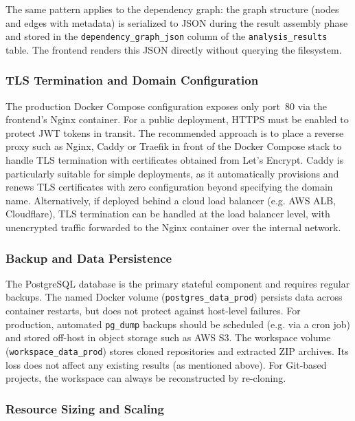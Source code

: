 The same pattern applies to the dependency graph: the graph structure (nodes and edges with metadata) is serialized to JSON during the result assembly phase and stored in the \texttt{dependency\_graph\_json} column of the \texttt{analysis\_results} table. The frontend renders this JSON directly without querying the filesystem.

\subsubsection{TLS Termination and Domain Configuration}
\label{subsubsec:tls}

\par The production Docker Compose configuration exposes only port~80 via the frontend's Nginx container. For a public deployment, HTTPS must be enabled to protect JWT tokens in transit. The recommended approach is to place a reverse proxy such as Nginx, Caddy or Traefik in front of the Docker Compose stack to handle TLS termination with certificates obtained from Let's Encrypt. Caddy is particularly suitable for simple deployments, as it automatically provisions and renews TLS certificates with zero configuration beyond specifying the domain name. Alternatively, if deployed behind a cloud load balancer (e.g. AWS ALB, Cloudflare), TLS termination can be handled at the load balancer level, with unencrypted traffic forwarded to the Nginx container over the internal network.

\subsubsection{Backup and Data Persistence}
\label{subsubsec:backup}

\par The PostgreSQL database is the primary stateful component and requires regular backups. The named Docker volume (\texttt{postgres\_data\_prod}) persists data across container restarts, but does not protect against host-level failures. For production, automated \texttt{pg\_dump} backups should be scheduled (e.g. via a cron job) and stored off-host in object storage such as AWS S3. The workspace volume (\texttt{workspace\_data\_prod}) stores cloned repositories and extracted ZIP archives. Its loss does not affect any existing results (as mentioned above). For Git-based projects, the workspace can always be reconstructed by re-cloning.

\subsubsection{Resource Sizing and Scaling}
\label{subsubsec:scaling}


